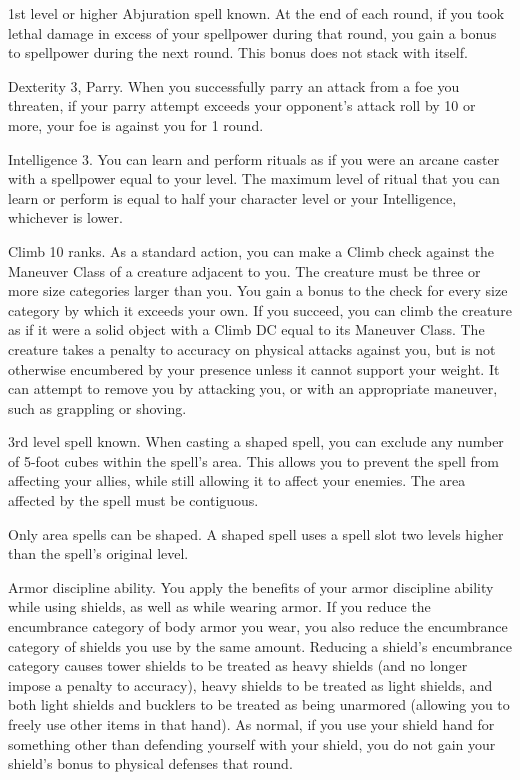 \featpre 1st level or higher Abjuration spell known.
\featben At the end of each round, if you took lethal damage in excess of your spellpower during that round, you gain a  bonus to spellpower during the next round.
This bonus does not stack with itself.

\featpres Dexterity 3, Parry.
\featben When you successfully parry an attack from a foe you threaten, if your parry attempt exceeds your opponent's attack roll by 10 or more, your foe is  against you for 1 round.

\featpre Intelligence 3.
\featben You can learn and perform rituals as if you were an arcane caster with a spellpower equal to your level.
The maximum level of ritual that you can learn or perform is equal to half your character level or your Intelligence, whichever is lower.

\featpre Climb 10 ranks.
\featben As a standard action, you can make a Climb check against the Maneuver Class of a creature adjacent to you.
The creature must be three or more size categories larger than you.
You gain a  bonus to the check for every size category by which it exceeds your own.
If you succeed, you can climb the creature as if it were a solid object with a Climb DC equal to its Maneuver Class.
The creature takes a  penalty to accuracy on physical attacks against you, but is not otherwise encumbered by your presence unless it cannot support your weight.
It can attempt to remove you by attacking you, or with an appropriate maneuver, such as grappling or shoving.

\featpre 3rd level spell known.
\featben When casting a shaped spell, you can exclude any number of 5-foot cubes within the spell's area.
This allows you to prevent the spell from affecting your allies, while still allowing it to affect your enemies.
The area affected by the spell must be contiguous.

Only area spells can be shaped.
A shaped spell uses a spell slot two levels higher than the spell's original level.

\featpre Armor discipline ability.
\featben You apply the benefits of your armor discipline ability while using shields, as well as while wearing armor.
If you reduce the encumbrance category of body armor you wear, you also reduce the encumbrance category of shields you use by the same amount.
Reducing a shield's encumbrance category causes tower shields to be treated as heavy shields (and no longer impose a  penalty to accuracy), heavy shields to be treated as light shields, and both light shields and bucklers to be treated as being unarmored (allowing you to freely use other items in that hand).
As normal, if you use your shield hand for something other than defending yourself with your shield, you do not gain your shield's bonus to physical defenses that round.

